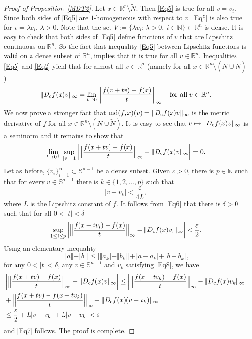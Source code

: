 \documentclass[12pt,leqno]{amsart}
\theoremstyle{definition}
\newcommand{\bbbn}{\mathbb N}
\newcommand{\bbbr}{\mathbb R}
\newcommand{\Sph}{\mathbb S}
\newcommand{\eps}{\varepsilon}
\def\md{\operatorname{md}}
\numberwithin{theorem}{section} \numberwithin{equation}{section}
\begin{document}
\begin{proof}[Proof of Proposition~\ref{MDT2}]
Let $x\in\bbbr^n\setminus\tilde{N}$. Then \eqref{Eq5} is true for all $v=v_i$. Since both sides of \eqref{Eq5} are $1$-homogeneous with respect to $v$, \eqref{Eq5} is also true for $v=\lambda v_i$, $\lambda>0$. Note that the set
$V:=\{\lambda v_i:\, \lambda>0,\ i\in\bbbn\}\subset\bbbr^n$ is dense.
It is easy to check that both sides of \eqref{Eq5} define functions of $v$ that are Lipschitz continuous on $\bbbr^n$. So the fact that inequality \eqref{Eq5} between Lipschitz functions is valid on a dense subset of $\bbbr^n$, implies that it is true for all $v\in\bbbr^n$. Inequalities \eqref{Eq5} and \eqref{Eq2} yield that for almost all $x\in\bbbr^n$ (namely for all $x\in\bbbr^n\setminus (N\cup\tilde{N})$)
\begin{equation}
\label{Eq6}
\Vert D_{\rm c}f(x)v\Vert_\infty = \lim_{t\to 0} \left\Vert \frac{f(x+tv)-f(x)}{t}\right\Vert_\infty
\quad
\text{for all $v\in\bbbr^n$.}
\end{equation}
We now prove a stronger fact that
$\md (f,x)(v)= \Vert D_{\rm c}f(x)v\Vert_\infty$
is the metric derivative of $f$ for all $x\in\bbbr^n\setminus (N\cup\tilde{N})$.
It is easy to see that $v\mapsto\Vert D_{\rm c}f(x)v\Vert_\infty$ is a seminorm and it remains to show that
\begin{equation}
\label{Eq7}
\lim_{t\to 0^+}\, \sup_{|v|=1} \left|\Big\Vert\frac{f(x+tv)-f(x)}{t} \Big\Vert_\infty-\Vert D_{\rm c}f(x)v\Vert_\infty\right|=0.
\end{equation}
Let as before, $\{v_i\}_{i=1}^\infty\subset\Sph^{n-1}$ be a dense subset. Given $\eps>0$, there is $p\in\bbbn$ such that for every $v\in\Sph^{n-1}$ there is $k\in \{1,2,\ldots,p\}$ such that
\begin{equation}
\label{Eq8}
|v-v_k|<\frac{\eps}{4L},
\end{equation}
where $L$ is the Lipschitz constant of $f$. It follows from \eqref{Eq6} that there is $\delta>0$ such that for all $0<|t|<\delta$
$$
\sup_{1\leq i\leq p} \left|\Big\Vert\frac{f(x+tv_i)-f(x)}{t}\Big\Vert_\infty-\Vert D_{\rm c}f(x) v_i\Vert_\infty\right|<\frac{\eps}{2}.
$$
Using an elementary inequality
$$
\big|\Vert a\Vert-\Vert b\Vert\big|\leq \big|\Vert a_k\Vert-\Vert b_k\Vert\big|+\Vert a-a_k\Vert+\Vert b-b_k\Vert,
$$
for any $0<|t|<\delta$, any $v\in\Sph^{n-1}$ and $v_k$ satisfying \eqref{Eq8}, we have
\begin{equation*}
\begin{split}
&\left|\Big\Vert\frac{f(x+tv)-f(x)}{t}\Big\Vert_\infty-\Vert D_{\rm c}f(x) v\Vert_\infty\right|
\leq
\left|\Big\Vert\frac{f(x+tv_k)-f(x)}{t}\Big\Vert_\infty-\Vert D_{\rm c}f(x) v_k\Vert_\infty\right|\\
&+
\Big\Vert\frac{f(x+tv)-f(x+tv_k)}{t}\Big\Vert_\infty
+
\Vert D_{\rm c}f(x)(v-v_k)\Vert_\infty\\
&\leq
\frac{\eps}{2}+L|v-v_k|+L|v-v_k|<\eps
\end{split}
\end{equation*}
and \eqref{Eq7} follows. The proof is complete.
\end{proof}
\end{document}
